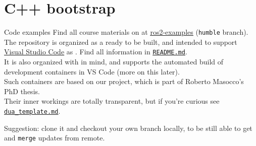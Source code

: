 
\section{C++ bootstrap}
\graphicspath{{figs/section2/}}

\begin{frame}{Code examples}
	Find all course materials on  at \href{https://github.com/IntelligentSystemsLabUTV/ros2-examples}{\color{blue}\underline{ros2-examples}} (\texttt{humble} branch).\\
	\bigskip
	The repository is organized as a  ready to be built, and intended to support \href{https://code.visualstudio.com/}{\color{blue}\underline{Visual Studio Code}} as . Find all information in \href{https://github.com/IntelligentSystemsLabUTV/ros2-examples/blob/humble/README.md}{\color{blue}\underline{\texttt{README.md}}}.\\
	\bigskip
	It is also organized with  in mind, and supports the automated build of development containers in VS Code (more on this later).\\
	Such containers are based on our \href{https://github.com/IntelligentSystemsLabUTV/dua-template}{} project, which is part of Roberto Masocco's PhD thesis.\\
	Their inner workings are totally transparent, but if you're curious see \href{https://github.com/IntelligentSystemsLabUTV/ros2-examples/blob/humble/dua_template.md}{\color{blue}\underline{\texttt{dua\_template.md}}}.
	\begin{block}{}
		\centering
		Suggestion: clone it and checkout your own branch locally, to be still able to get and \texttt{merge} updates from remote.
	\end{block}
\end{frame}

